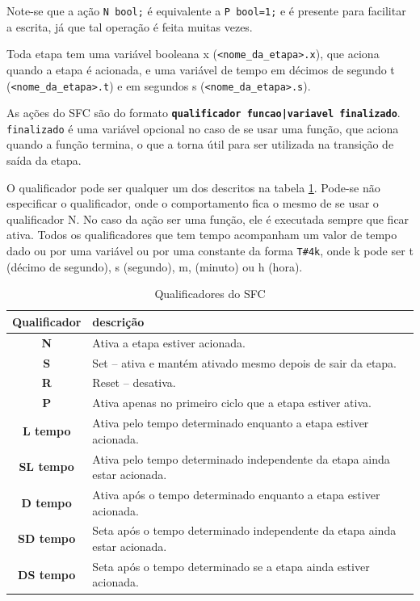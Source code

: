 Note-se que a ação \lstinline/N bool;/ é equivalente a \lstinline/P bool=1;/ e é presente para facilitar a escrita, já que tal operação é feita muitas vezes.

Toda etapa tem uma variável booleana x (\lstinline|<nome_da_etapa>.x|), que aciona quando a etapa é acionada, e uma variável de tempo em décimos de segundo t (\lstinline|<nome_da_etapa>.t|) e em segundos s (\lstinline|<nome_da_etapa>.s|).

As ações do SFC são do formato \textbf{\lstinline/qualificador funcao|variavel finalizado/}. \lstinline|finalizado| é uma variável opcional no caso de se usar uma função, que aciona quando a função termina, o que a torna útil para ser utilizada na transição de saída da etapa.

O qualificador pode ser qualquer um dos descritos na tabela \ref{tab:qualiSFC}. Pode-se não especificar o qualificador, onde o comportamento fica o mesmo de se usar o qualificador N. No caso da ação ser uma função, ele é executada sempre que ficar ativa. Todos os qualificadores que tem tempo acompanham um valor de tempo dado ou por uma variável ou por uma constante da forma \lstinline|T#4k|, onde k pode ser t (décimo de segundo), s (segundo), m, (minuto) ou h (hora).
\begin{table}[hbt]
  \caption{Qualificadores do SFC}
  \label{tab:qualiSFC}
  \centering

  \begin{tabularx}{\textwidth}{|c|X|}
  \hline

  \hline
  \textbf{Qualificador} & \textbf{descrição}\\
  \hline
   \textbf{N}  & Ativa a etapa estiver acionada. \\
   \textbf{S}  & Set -- ativa e mantém ativado mesmo depois de sair da etapa. \\
   \textbf{R}  & Reset -- desativa. \\
   \textbf{P}  & Ativa apenas no primeiro ciclo que a etapa estiver ativa. \\
   \textbf{L tempo}  & Ativa pelo tempo determinado enquanto a etapa estiver acionada.\\
   \textbf{SL tempo}  & Ativa pelo tempo determinado independente da etapa ainda estar acionada.\\
   \textbf{D tempo}  & Ativa após o tempo determinado enquanto a etapa estiver acionada.\\
   \textbf{SD tempo}  & Seta após o tempo determinado independente da etapa ainda estar acionada.\\
   \textbf{DS tempo}  & Seta após o tempo determinado se a etapa ainda estiver acionada.\\
  \hline

  \hline
  \end{tabularx}
\end{table}

